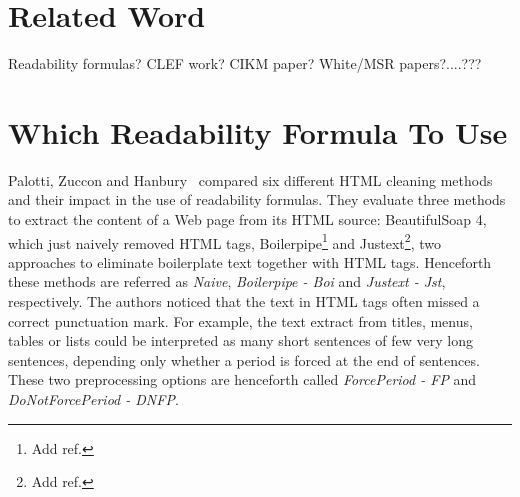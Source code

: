 \documentclass[runningheads,a4paper]{llncs}
\begin{document}


\section{Related Word}
\label{sec:related}
Readability formulas? CLEF work? CIKM paper? White/MSR papers?....???

\section{Which Readability Formula To Use}
\label{sec:which_readability}


Palotti, Zuccon and Hanbury~\cite{palotti15} compared six different HTML cleaning methods and their impact in the use of readability formulas.
They evaluate three methods to extract the content of a Web page from its HTML source: BeautifulSoap 4, which just naively removed HTML tags, Boilerpipe\footnote{Add ref.} and Justext\footnote{Add ref.}, two approaches to eliminate boilerplate text together with HTML tags. Henceforth these methods are referred as \textit{Naive}, \textit{Boilerpipe - Boi} and \textit{Justext - Jst}, respectively.
The authors noticed that the text in HTML tags often missed a correct punctuation mark. For example, the text extract from titles, menus, tables or lists could be interpreted as many short sentences of few very long sentences, depending only whether a period is forced at the end of sentences. These two preprocessing options are henceforth called \textit{ForcePeriod - FP} and \textit{DoNotForcePeriod - DNFP}.
\end{document}
